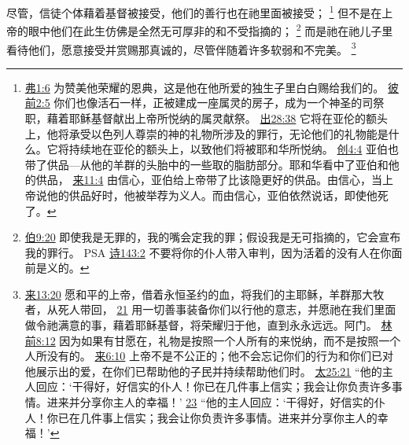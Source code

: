 \documentclass[12pt, a4paper, oneside]{ctexart}
\newcounter{parnum}[section]
\newcommand{\N}{%
   \noindent\refstepcounter{parnum}%
    \makebox[\parindent][l]{\textbf{\arabic{parnum}.}}}
\begin{document}
\N 尽管，信徒个体藉着基督被接受，他们的善行也在祂里面被接受；
	\footnote {
		\href{https://biblehub.com/ephesians/1-6.htm}{弗1:6} 为赞美他荣耀的恩典，这是他在他所爱的独生子里白白赐给我们的。
		\href{https://biblehub.com/1_peter/2-5.htm}{彼前2:5} 你们也像活石一样，正被建成一座属灵的房子，成为一个神圣的司祭职，藉着耶稣基督献出上帝所悦纳的属灵献祭。
		\href{https://biblehub.com/exodus/28-38.htm}{出28:38} 它将在亚伦的额头上，他将承受以色列人尊崇的神的礼物所涉及的罪行，无论他们的礼物能是什么。它将持续地在亚伦的额头上，以致他们将被耶和华所悦纳。
		\href{https://biblehub.com/genesis/4-4.htm}{创4:4} 亚伯也带了供品---从他的羊群的头胎中的一些取的脂肪部分。耶和华看中了亚伯和他的供品，
		\href{https://biblehub.com/hebrews/11-4.htm}{来11:4} 由信心，亚伯给上帝带了比该隐更好的供品。由信心，当上帝说他的供品好时，他被举荐为义人。而由信心，亚伯依然说话，即使他死了。
	}
	但不是在上帝的眼中他们在此生仿佛是全然无可厚非的和不受指摘的；
	\footnote {
		\href{https://biblehub.com/job/9-20.htm}{伯9:20} 即使我是无罪的，我的嘴会定我的罪；假设我是无可指摘的，它会宣布我的罪行。
		PSA
		\href{https://biblehub.com/psalms/143-2.htm}{诗143:2} 不要将你的仆人带入审判，因为活着的没有人在你面前是义的。
	}
	而是祂在祂儿子里看待他们，愿意接受并赏赐那真诚的，尽管伴随着许多软弱和不完美。
	\footnote {
		\href{https://biblehub.com/hebrews/13-20.htm}{来13:20} 愿和平的上帝，借着永恒圣约的血，将我们的主耶稣，羊群那大牧者，从死人带回，
		\href{https://biblehub.com/hebrews/13-21.htm}{21} 用一切善事装备你们以行他的意志，并愿祂在我们里面做令祂满意的事，藉着耶稣基督，将荣耀归于他，直到永永远远。阿门。
		\href{https://biblehub.com/2_corinthians/8-12.htm}{林前8:12} 因为如果有甘愿在，礼物是按照一个人所有的来悦纳，而不是按照一个人所没有的。
		\href{https://biblehub.com/hebrews/6-10.htm}{来6:10} 上帝不是不公正的；他不会忘记你们的行为和你们已对他展示出的爱，在你们已帮助他的子民并持续帮助他们时。
		\href{https://biblehub.com/matthew/25-21.htm}{太25:21} “他的主人回应：‘干得好，好信实的仆人！你已在几件事上信实；我会让你负责许多事情。进来并分享你主人的幸福！’
		\href{https://biblehub.com/matthew/25-23.htm}{23} “他的主人回应：‘干得好，好信实的仆人！你已在几件事上信实；我会让你负责许多事情。进来并分享你主人的幸福！’
	}
\end{document}
